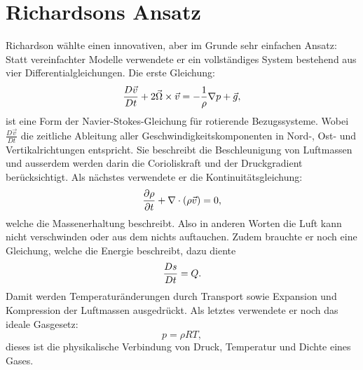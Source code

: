 %
%
%
%
\section{Richardsons Ansatz \label{geostrophisch:section:richardsonAnsatz}}

Richardson wählte einen innovativen, aber im Grunde sehr einfachen Ansatz:  
Statt vereinfachter Modelle verwendete er ein vollständiges System bestehend aus vier Differentialgleichungen.
Die erste Gleichung:
\begin{equation}
	\frac{D\vec{v}}{Dt} + 2\vec{\Omega} \times \vec{v} = -\frac{1}{\rho}\nabla p + \vec{g} \\,
	\label{eq:navstok}
\end{equation}
ist eine Form der Navier-Stokes-Gleichung für rotierende Bezugssysteme.
Wobei $\frac{D\vec{v}}{Dt}$ die zeitliche Ableitung aller Geschwindigkeitskomponenten in Nord-, Ost- und Vertikalrichtungen entspricht. 
Sie beschreibt die Beschleunigung von Luftmassen und ausserdem werden darin die Corioliskraft und der Druckgradient berücksichtigt.
Als nächstes verwendete er die Kontinuitätsgleichung:
\begin{equation}
	\frac{\partial \rho}{\partial t} + \nabla \cdot (\rho \vec{v}) = 0 \\,
	\label{eq:kont}
\end{equation}
welche die Massenerhaltung beschreibt.
Also in anderen Worten die Luft kann nicht verschwinden oder aus dem nichts auftauchen. 
Zudem brauchte er noch eine Gleichung, welche die Energie beschreibt, dazu diente 
\begin{equation}
	\frac{Ds}{Dt} = Q \\.
	\label{eq:enrgy}
\end{equation}
Damit werden Temperaturänderungen durch Transport sowie Expansion und Kompression der Luftmassen ausgedrückt.
Als letztes verwendete er noch das ideale Gasgesetz:
\begin{equation}
	p = \rho R T,
	\label{eq:gasgesetz}
\end{equation}
dieses ist die physikalische Verbindung von Druck, Temperatur und Dichte eines Gases.  

